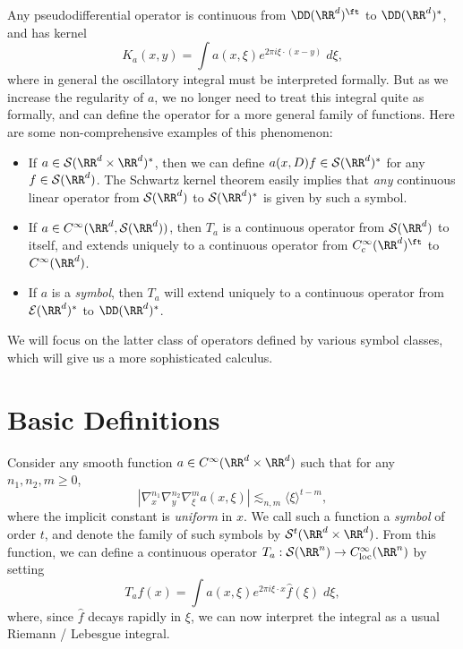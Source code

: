 Any pseudodifferential operator is continuous from $\DD(\RR^d)^\ft$ to $\DD(\RR^d)^*$, and has kernel
%
\[ K_a(x,y) = \int a(x,\xi) e^{2 \pi i \xi \cdot (x - y)}\; d\xi, \]
%
where in general the oscillatory integral must be interpreted formally. But as we increase the regularity of $a$, we no longer need to treat this integral quite as formally, and can define the operator for a more general family of functions. Here are some non-comprehensive examples of this phenomenon:
%
\begin{itemize}
    \item If $a \in \mathcal{S}(\RR^d \times \RR^d)^*$, then we can define $a(x,D) f \in \mathcal{S}(\RR^d)^*$ for any $f \in \mathcal{S}(\RR^d)$. The Schwartz kernel theorem easily implies that \emph{any} continuous linear operator from $\mathcal{S}(\RR^d)$ to $\mathcal{S}(\RR^d)^*$ is given by such a symbol.

    \item If $a \in C^\infty(\RR^d, \mathcal{S}(\RR^d))$, then $T_a$ is a continuous operator from $\mathcal{S}(\RR^d)$ to itself, and extends uniquely to a continuous operator from $C_c^\infty(\RR^d)^\ft$ to $C^\infty(\RR^d)$.

    \item If $a$ is a \emph{symbol}, then $T_a$ will extend uniquely to a continuous operator from $\mathcal{E}(\RR^d)^*$ to $\DD(\RR^d)^*$.
\end{itemize}
%
We will focus on the latter class of operators defined by various symbol classes, which will give us a more sophisticated calculus.

\section{Basic Definitions}

Consider any smooth function $a \in C^\infty(\RR^d \times \RR^d)$ such that for any $n_1,n_2,m \geq 0$,
%
\[ |\nabla_x^{n_1} \nabla_y^{n_2} \nabla_\xi^m a(x,\xi)| \lesssim_{n,m} \langle \xi \rangle^{t - m}, \]
%
where the implicit constant is \emph{uniform} in $x$. We call such a function a \emph{symbol} of order $t$, and denote the family of such symbols by $\mathcal{S}^t(\RR^d \times \RR^d)$. From this function, we can define a continuous operator $T_a: \mathcal{S}(\RR^n) \to C^\infty_{\text{loc}}(\RR^n)$ by setting
%
\[ T_a f(x) = \int a(x,\xi) e^{2 \pi i \xi \cdot x} \widehat{f}(\xi)\; d\xi, \]
%
where, since $\widehat{f}$ decays rapidly in $\xi$, we can now interpret the integral as a usual Riemann / Lebesgue integral.

